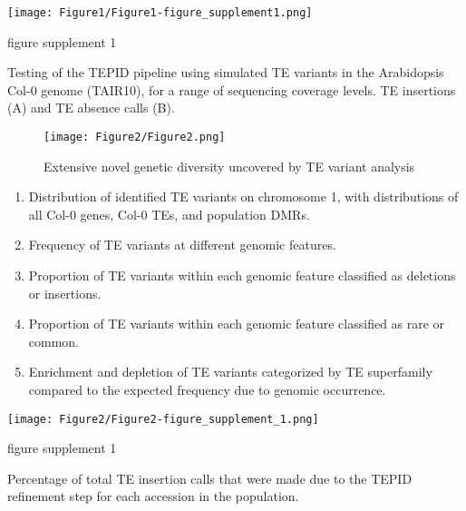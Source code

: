 \documentclass[12pt]{article}
\begin{document}
\pagebreak



\begin{suppfigure}[h]
  \centering
  \texttt{[image: Figure1/Figure1-figure\_supplement1.png]}
  \caption{figure supplement 1}
  \label{fig1s1}
\end{suppfigure}

Testing of the TEPID pipeline using simulated TE variants in the
Arabidopsis Col-0 genome (TAIR10), for a range of sequencing coverage
levels. TE insertions (A) and TE absence calls (B).

\pagebreak



\begin{figure}[h]
  \centering
  \texttt{[image: Figure2/Figure2.png]}
  \caption{Extensive novel genetic diversity uncovered by TE variant analysis}
  \label{fig2}
\end{figure}


\begin{enumerate}
  \def\labelenumi{(\Alph{enumi})}
\item
  Distribution of identified TE variants on chromosome 1, with
  distributions of all Col-0 genes, Col-0 TEs, and population DMRs.
\item
  Frequency of TE variants at different genomic features.
\item
  Proportion of TE variants within each genomic feature classified as
  deletions or insertions.
\item
  Proportion of TE variants within each genomic feature classified as
  rare or common.
\item
  Enrichment and depletion of TE variants categorized by TE superfamily
  compared to the expected frequency due to genomic occurrence.
\end{enumerate}

\pagebreak


\setcounter{suppfigure}{1}
\begin{suppfigure}
  \centering
  \texttt{[image: Figure2/Figure2-figure\_supplement\_1.png]}
  \caption{figure supplement 1}
  \label{fig2s1}
\end{suppfigure}

Percentage of total TE insertion calls that were made due to the TEPID
refinement step for each accession in the population.
\end{document}

